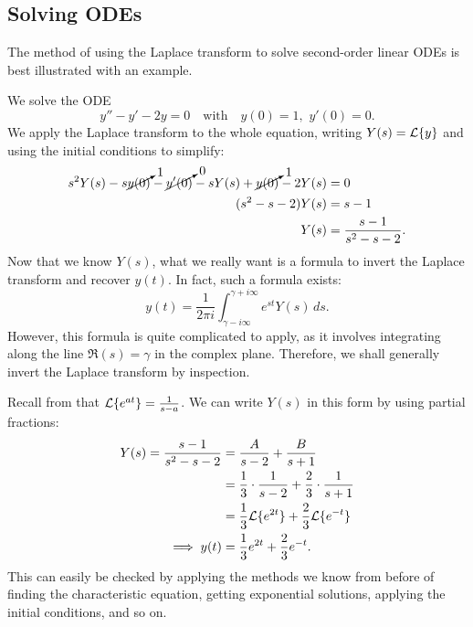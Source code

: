 \subsection{Solving ODEs}

The method of using the Laplace transform to solve second-order linear ODEs is best illustrated with an example.

\begin{eg}
	We solve the ODE
	\[
	y''-y'-2y = 0 \quad\text{with}\quad y(0)=1, \,\,y'(0)=0.
	\]
	We apply the Laplace transform to the whole equation, writing $Y(s) = \mathcal{L}\{y\}$ and using the initial conditions to simplify:
	\begin{align*}
		s^2Y(s) - s\cancelto{1}{y(0)} - \cancelto{0}{y'(0)} - sY(s) + \cancelto{1}{y(0)} - 2Y(s) &= 0 \\
		(s^2-s-2)Y(s) &= s-1 \\
		Y(s) &= \frac{s-1}{s^2-s-2}.
	\end{align*}
	Now that we know $Y(s)$, what we really want is a formula to invert the Laplace transform and recover $y(t)$. In fact, such a formula exists:
	\[
	y(t) = \frac{1}{2\pi i} \int_{\gamma-i\infty}^{\gamma+i\infty} e^{st}Y(s) \,ds.
	\]
	However, this formula is quite complicated to apply, as it involves integrating along the line $\Re(s) = \gamma$ in the complex plane. Therefore, we shall generally invert the Laplace transform by inspection.
	
	Recall from  that $\mathcal{L}\{e^{at}\} = \frac{1}{s-a}$. We can write $Y(s)$ in this form by using partial fractions:
	\begin{align*}
		Y(s) = \frac{s-1}{s^2-s-2} &= \frac{A}{s-2} + \frac{B}{s+1} \\
		&= \frac13\cdot\frac{1}{s-2} + \frac23\cdot\frac{1}{s+1} \\
		&= \frac13\mathcal{L}\{e^{2t}\} + \frac23\mathcal{L}\{e^{-t}\} \\
		\implies y(t) &= \frac13e^{2t} + \frac23e^{-t}.
	\end{align*}
	This can easily be checked by applying the methods we know from before of finding the characteristic equation, getting exponential solutions, applying the initial conditions, and so on.
\end{eg}

